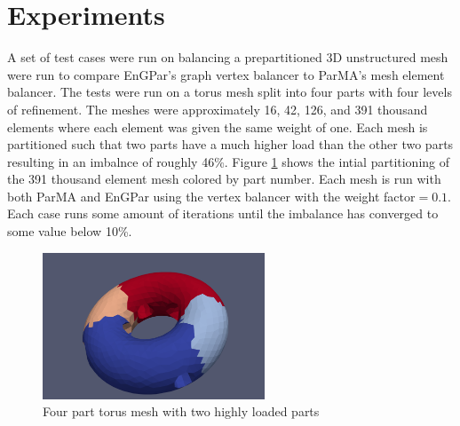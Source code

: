 \documentclass[a4paper]{article}
\begin{document}
\section{Experiments}
A set of test cases were run on balancing a prepartitioned 3D unstructured mesh were run to compare EnGPar's graph vertex balancer to ParMA's mesh element balancer. The tests were run on a torus mesh split into four parts with four levels of refinement. The meshes were approximately 16, 42, 126, and 391 thousand elements where each element was given the same weight of one. Each mesh is partitioned such that two parts have a much higher load than the other two parts resulting in an imbalnce of roughly 46\%. Figure \ref{fig:torus} shows the intial partitioning of the 391 thousand element mesh colored by part number. Each mesh is run with both ParMA and EnGPar using the vertex balancer with the weight factor$=0.1$. Each case runs some amount of iterations until the imbalance has converged to some value below 10\%.


\begin{figure}[!ht]
  \label{fig:torus}
  \centering
  \includegraphics[width=250px]{torus.png}
  \caption{Four part torus mesh with two highly loaded parts}
\end{figure}
\end{document}
